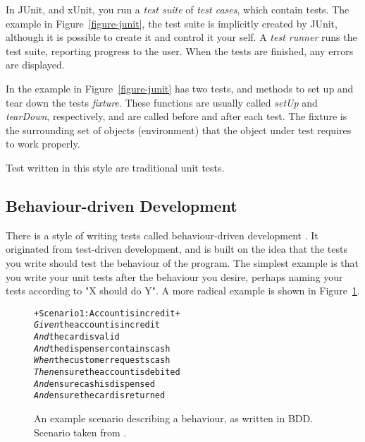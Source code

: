 \documentclass[a4paper,11pt]{kth-mag}
\begin{document}
In JUnit, and xUnit, you run a \textit{test suite} of \textit{test cases},
which contain tests. The example in Figure~\ref{figure-junit}, the test suite
is implicitly created by JUnit, although it is possible to create it and
control it your self. A \textit{test runner} runs the test suite, reporting
progress to the user.  When the tests are finished, any errors are displayed.

In the example in Figure~\ref{figure-junit} has two tests, and methods to set
up and tear down the tests \textit{fixture}. These functions are usually called
\textit{setUp} and \textit{tearDown}, respectively, and are called before and
after each test. The fixture is the surrounding set of objects (environment)
that the object under test requires to work properly.

Test written in this style are traditional unit tests.


\subsection{Behaviour-driven Development}

There is a style of writing tests called behaviour-driven development
\cite{north06bdd}. It originated from test-driven development, and is built on
the idea that the tests you write should test the behaviour of the program. The
simplest example is that you write your unit tests after the behaviour you
desire, perhaps naming your tests according to "X should do Y". A more radical
example is shown in Figure~\ref{figure-bdd}.

\begin{figure}[h!]
	\begin{center}
	\begin{minipage}{0.7\textwidth}
\begin{alltt}
+Scenario 1: Account is in credit+
\textit{Given} the account is in credit
\textit{And} the card is valid
\textit{And} the dispenser contains cash
\textit{When} the customer requests cash
\textit{Then} ensure the account is debited
\textit{And} ensure cash is dispensed
\textit{And} ensure the card is returned
\end{alltt}
	\end{minipage}
	\end{center}

\caption{An example scenario describing a behaviour, as written in BDD.
Scenario taken from \cite{north06bdd}.}
\label{figure-bdd}
\end{figure}
\end{document}
